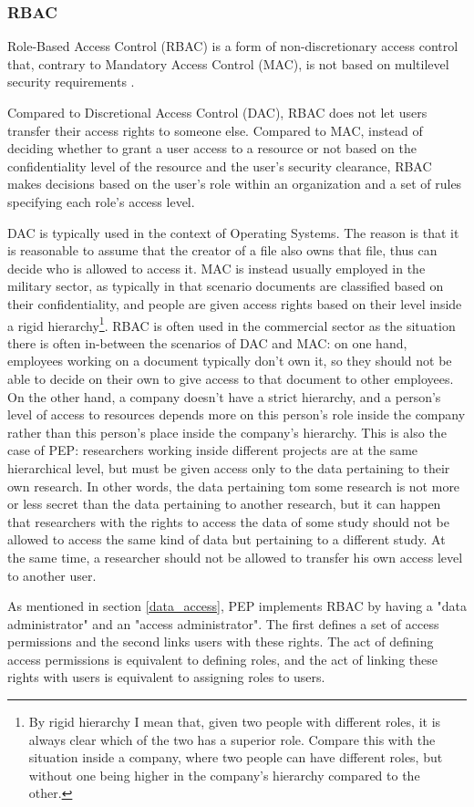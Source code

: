 \documentclass{report}
\begin{document}
\subsubsection{RBAC}
Role-Based Access Control (RBAC) is a form of non-discretionary access control that, contrary to Mandatory Access Control (MAC), is not based on multilevel security requirements \cite{rbac}. \par
Compared to Discretional Access Control (DAC), RBAC does not let users transfer their access rights to someone else. Compared to MAC, instead of deciding whether to grant a user access 
to a resource or not based on the confidentiality level of the resource and the user's security clearance, RBAC makes decisions based on the user's role within an organization and a set 
of rules specifying each role's access level. \par
DAC is typically used in the context of Operating Systems. The reason is that it is reasonable to assume that the creator of a file also owns that file, thus can decide who is
allowed to access it. MAC is instead usually employed in the military sector, as typically in that scenario documents are classified based on their confidentiality, and people are
given access rights based on their level inside a rigid hierarchy\footnote{By rigid hierarchy I mean that, given two people with different roles, it is always clear which of the two 
has a superior role. Compare this with the situation inside a company, where two people can have different roles, but without one being higher in the company's hierarchy compared to
the other.}. RBAC is often used in the commercial sector as the situation there is often in-between the scenarios of DAC and MAC: on one hand, employees working on a document
typically don't own it, so they should not be able to decide on their own to give access to that document to other employees. On the other hand, a company doesn't have a strict
hierarchy, and a person's level of access to resources depends more on this person's role inside the company rather than this person's place inside the company's hierarchy. This is
also the case of PEP: researchers working inside different projects are at the same hierarchical level, but must be given access only to the data pertaining to their own research. In
other words, the data pertaining tom some research is not more or less secret than the data pertaining to another research, but it can happen that researchers with the rights to access
the data of some study should not be allowed to access the same kind of data but pertaining to a different study. At the same time, a researcher should not be allowed to transfer his
own access level to another user. \par
As mentioned in section \ref{data_access}, PEP implements RBAC by having a "data administrator" and an "access administrator". The first defines a set of access permissions and the
second links users with these rights. The act of defining access permissions is equivalent to defining roles, and the act of linking these rights with users is equivalent to assigning
roles to users. 
\end{document}
